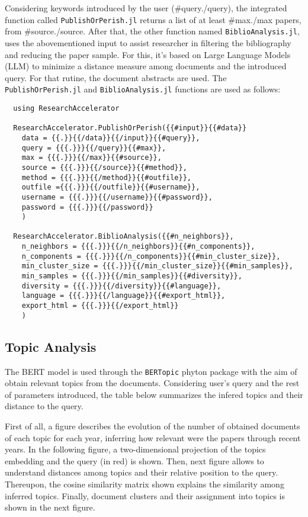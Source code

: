 \documentclass{article}
\begin{document}
Considering keywords introduced by the user ({{#query}}{{{.}}}{{/query}}), the integrated function called \verb|PublishOrPerish.jl| returns a list of at least {{#max}}{{{.}}}{{/max}} papers, from {{#source}}{{.}}{{/source}}. After that, the other function named \verb|BiblioAnalysis.jl|, uses the abovementioned input to assist researcher in filtering the bibliography and reducing the paper sample. For this, it's based on Large Language Models (LLM) to minimize a distance measure among documents and the introduced query. For that rutine, the document abstracts are used. The \verb|PublishOrPerish.jl| and \verb|BiblioAnalysis.jl| functions are used as follows:

\begin{lstlisting} 
  using ResearchAccelerator

  ResearchAccelerator.PublishOrPerish({{#input}}{{#data}}
    data = {{.}}{{/data}}{{/input}}{{#query}},
    query = {{{.}}}{{/query}}{{#max}},
    max = {{{.}}}{{/max}}{{#source}}, 
    source = {{{.}}}{{/source}}{{#method}}, 
    method = {{{.}}}{{/method}}{{#outfile}}, 
    outfile ={{{.}}}{{/outfile}}{{#username}},
    username = {{{.}}}{{/username}}{{#password}},
    password = {{{.}}}{{/password}}
    )

  ResearchAccelerator.BiblioAnalysis({{#n_neighbors}},
    n_neighbors = {{{.}}}{{/n_neighbors}}{{#n_components}}, 
    n_components = {{{.}}}{{/n_components}}{{#min_cluster_size}}, 
    min_cluster_size = {{{.}}}{{/min_cluster_size}}{{#min_samples}},
    min_samples = {{{.}}}{{/min_samples}}{{#diversity}},
    diversity = {{{.}}}{{/diversity}}{{#language}},
    language = {{{.}}}{{/language}}{{#export_html}},
    export_html = {{{.}}}{{/export_html}}
    )

\end{lstlisting}

\subsection{Topic Analysis}
The BERT model is used through the \verb|BERTopic| phyton package with the aim of obtain relevant topics from the documents. Considering user's query and the rest of parameters introduced, the table below summarizes the infered topics and their distance to the query.

\begin{table}
  \centering
    
\end{table}

First of all, a figure describes the evolution of the number of obtained documents of each topic for each year, inferring how relevant were the papers through recent years. In the following figure, a two-dimensional projection of the topics embedding and the query (in red) is shown. Then, next figure allows to understand distances among topics and their relative position to the query. Thereupon, the cosine similarity matrix shown explains the similarity among inferred topics. Finally, document clusters and their assignment into topics is shown in the next figure.
\end{document}
